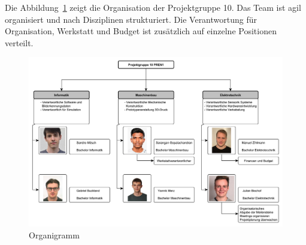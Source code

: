 \documentclass[../main.tex]{subfiles}
\begin{document}
Die Abbildung~\ref{fig:Organigramm} zeigt die Organisation der Projektgruppe
10. Das Team ist agil organisiert und nach Disziplinen strukturiert. Die
Verantwortung für Organisation, Werkstatt und Budget ist zusätzlich auf
einzelne Positionen verteilt.

\begin{figure}[h!]
    \centering
    \includegraphics[page=1, width=1\textwidth]{../resources/Organigramm.pdf}
    \caption{Organigramm}\label{fig:Organigramm}
\end{figure}
\end{document}
